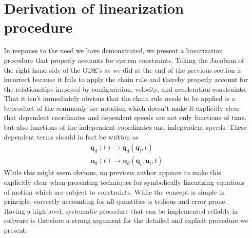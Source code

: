 \documentclass[smallcondensed,final]{svjour3}                     %
\begin{document}
\section{Derivation of linearization procedure}
\label{sec:derivations}
In response to the need we have demonstrated, we present a linearization
procedure that properly accounts for system constraints. Taking the Jacobian
of the right hand side of the ODE's as we did at the end of the previous
section is incorrect because it fails to apply the chain rule and thereby
properly account for the relationships imposed by configuration, velocity, and
acceleration constraints. That it isn't immediately obvious that the chain rule
needs to be applied is a byproduct of the commonly use notation which doesn't
make it explicitly clear that dependent coordinates and dependent speeds are not
only functions of time, but also functions of the independent coordinates and
independent speeds. These dependent terms should in fact be written as
\begin{align}
\label{eq:q_d_redefined}
\mathbf{q}_d (t) \to \mathbf{q}_d (\mathbf{q}_i, t) \\
\label{eq:u_d_redefined}
\mathbf{u}_d (t) \to \mathbf{u}_d (\mathbf{q}_i, \mathbf{u}_i, t)
\end{align}
While this might seem obvious, no previous author appears to make this
explicitly clear when presenting techniques for symbolically linearizing
equations of motion which are subject to constraints. While the concept is
simple in principle, correctly accounting for all quantities is tedious and
error prone. Having a high level, systematic procedure that can be implemented
reliably in software is therefore a strong argument for the detailed and
explicit procedure we present.
\end{document}
